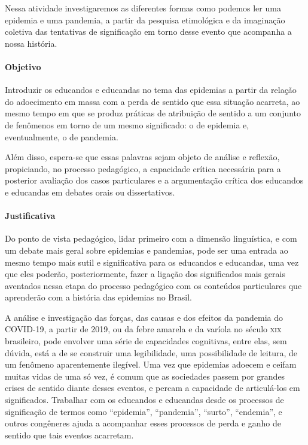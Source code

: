 \documentclass[12pt]{extarticle}
\begin{document}
Nessa atividade investigaremos as diferentes formas como
podemos ler uma epidemia e uma pandemia, a partir da pesquisa
etimológica e da imaginação coletiva das tentativas de significação em
torno desse evento que acompanha a nossa história.

\paragraph{Objetivo}

Introduzir os educandos e educandas no tema das epidemias a partir da
relação do adoecimento em massa com a perda de sentido que essa situação
acarreta, ao mesmo tempo em que se produz práticas de atribuição de
sentido a um conjunto de fenômenos em torno de um mesmo significado: o
de epidemia e, eventualmente, o de pandemia.

Além disso, espera-se que essas palavras sejam objeto de análise e
reflexão, propiciando, no processo pedagógico, a capacidade crítica
necessária para a posterior avaliação dos casos particulares e a
argumentação crítica dos educandos e educandas em debates orais ou
dissertativos.

\paragraph{Justificativa}

Do ponto de vista pedagógico, lidar primeiro com a dimensão linguística,
e com um debate mais geral sobre epidemias e pandemias, pode ser uma
entrada ao mesmo tempo mais sutil e significativa para os educandos e
educandas, uma vez que eles poderão, posteriormente, fazer a ligação dos
significados mais gerais aventados nessa etapa do processo pedagógico
com os conteúdos particulares que aprenderão com a história das
epidemias no Brasil.

A análise e investigação das forças, das causas e dos efeitos da
pandemia do COVID-19, a partir de 2019, ou da febre amarela e da varíola
no século \textsc{xix} brasileiro, pode envolver uma série de capacidades
cognitivas, entre elas, sem dúvida, está a de se construir uma
legibilidade, uma possibilidade de leitura, de um fenômeno aparentemente
ilegível. Uma vez que epidemias adoecem e ceifam muitas vidas de uma só
vez, é comum que as sociedades passem por grandes crises de sentido
diante desses eventos, e percam a capacidade de articulá-los em
significados. Trabalhar com os educandos e educandas desde os processos
de significação de termos como ``epidemia'', ``pandemia'', ``surto'',
``endemia'', e outros congêneres ajuda a acompanhar esses processos de
perda e ganho de sentido que tais eventos acarretam.
\end{document}
